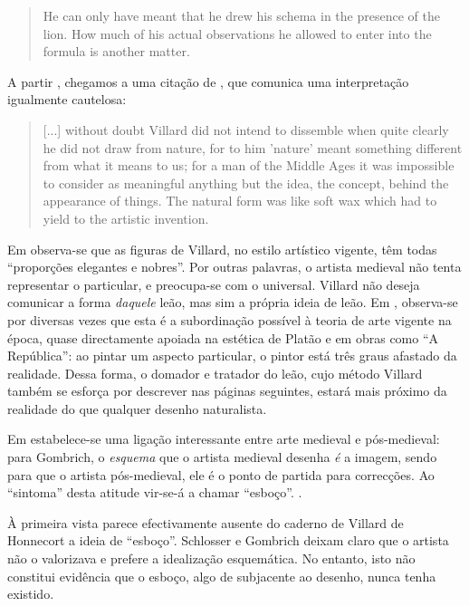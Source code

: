 \documentclass{article}
\begin{document}
\begin{quote}
  He can only have meant that he drew his schema in the presence of
  the lion. How much of his actual observations he allowed to enter
  into the formula is another matter.
\end{quote}

A partir \cite{teresa}, chegamos a uma citação de \cite{schlosser},
que comunica uma interpretação igualmente cautelosa:

 \begin{quote}
  [...] without doubt Villard did not intend to dissemble when quite
  clearly he did not draw from nature, for to him 'nature' meant
  something different from what it means to us; for a man of the
  Middle Ages it was impossible to consider as meaningful anything but
  the idea, the concept, behind the appearance of things. The natural
  form was like soft wax which had to yield to the artistic invention.
 \end{quote}

Em \cite{teresa} observa-se que as figuras de Villard, no estilo
artístico vigente, têm todas ``proporções elegantes e
nobres''. Por outras palavras, o artista medieval não tenta
representar o particular, e preocupa-se com o universal. Villard não
deseja comunicar a forma \emph{daquele} leão, mas sim a própria ideia
de leão. Em \cite{gombrich}, observa-se por diversas vezes que esta é
a subordinação possível à teoria de arte vigente na época, quase
directamente apoiada na estética de Platão e em obras como ``A
República'': ao pintar um aspecto particular, o pintor está três graus
afastado da realidade. Dessa forma, o domador e tratador do leão, cujo
método Villard também se esforça por descrever nas páginas seguintes,
estará mais próximo da realidade do que qualquer desenho naturalista.

Em \cite{gombrich} estabelece-se uma ligação interessante entre arte
medieval e pós-medieval: para Gombrich, o \emph{esquema} que o artista
medieval desenha \emph{é} a imagem, sendo para que o artista
pós-medieval, ele é o ponto de partida para correcções. Ao ``sintoma''
desta atitude vir-se-á a chamar ``esboço''. \cite[p. 68]{gombrich}.

À primeira vista parece efectivamente ausente do caderno de Villard de
Honnecort a ideia de ``esboço''. Schlosser e Gombrich deixam claro que
o artista não o valorizava e prefere a idealização esquemática. No
entanto, isto não constitui evidência que o esboço, algo de subjacente
ao desenho, nunca tenha existido.
\end{document}
